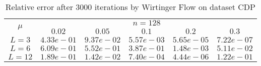 \begin{table}\label{gaussian}
\centering
\begin{tabular}{|c|c|c|c|c|c|}

\hline
\multirow{2}{*}{ $\mu$} &\multicolumn{5}{c|}{$n = 128 $}\\\cline{2-6}
 &$0.02$ &$0.05$ &$0.1$ &$0.2$ &$0.3$\\\hline
$L=3$ & $4.33e-01$ & $9.37e-02$ & $5.57e-03$ & $5.65e-05$ & $7.22e-07$\\\hline
$L=6$ & $6.09e-01$ & $5.52e-01$ & $3.87e-01$ & $1.48e-03$ & $5.11e-02$\\\hline
$L=12$ & $1.89e-01$ & $1.42e-02$ & $7.40e-04$ & $4.44e-06$ & $1.22e-01$\\\hline
\end{tabular}
\caption{Relative error after $3000$ iterations by Wirtinger Flow on dataset CDP}
\end{table}
